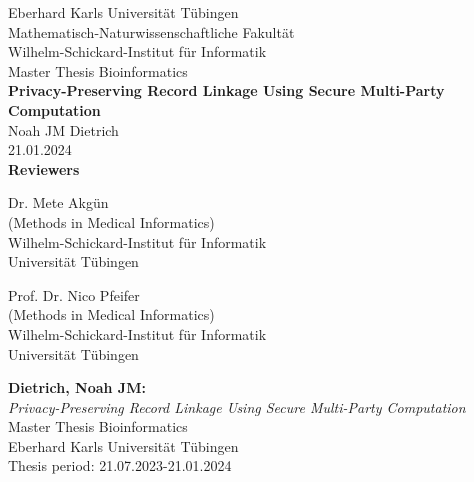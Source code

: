\documentclass[twoside,12pt,a4paper]{report}
\begin{document}
 
\begin{titlepage}
 \begin{center}
  {\LARGE Eberhard Karls Universit\"at T\"ubingen}\\
  {\large Mathematisch-Naturwissenschaftliche Fakult\"at \\
Wilhelm-Schickard-Institut f\"ur Informatik\\[4cm]}
  {\huge Master Thesis Bioinformatics\\[2cm]}
  {\Large\bf  Privacy-Preserving Record Linkage Using Secure Multi-Party Computation\\[1.5cm]}
 {\large Noah JM Dietrich}\\[0.5cm]
21.01.2024\\[4cm]
{\small\bf Reviewers}\\[0.5cm]
  \parbox{7cm}{\begin{center}{\large Dr. Mete Akg\"un}\\
   (Methods in Medical Informatics)\\
  {\footnotesize Wilhelm-Schickard-Institut f\"ur Informatik\\
	Universit\"at T\"ubingen}\end{center}}\hfill\parbox{7cm}{\begin{center}
  {\large Prof. Dr. Nico Pfeifer}\\
  (Methods in Medical Informatics)\\
  {\footnotesize Wilhelm-Schickard-Institut f\"ur Informatik\\
	Universit\"at T\"ubingen}\end{center}
 }
  \end{center}
\end{titlepage}


\thispagestyle{empty}
\vspace*{\fill}
\begin{minipage}{11.2cm}
\textbf{Dietrich, Noah JM:}\\
\emph{Privacy-Preserving Record Linkage Using Secure Multi-Party Computation}\\ Master Thesis Bioinformatics\\
Eberhard Karls Universit\"at T\"ubingen\\
Thesis period: 21.07.2023-21.01.2024
\end{minipage}
\newpage
\end{document}

